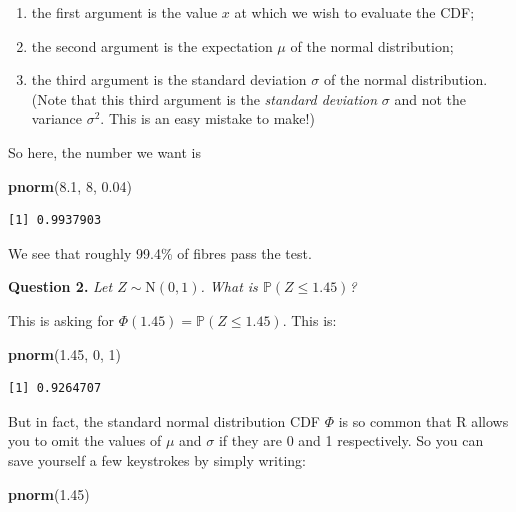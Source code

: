 \documentclass[
  a4paper,
]{book}
\newenvironment{Shaded}{\begin{snugshade}}{\end{snugshade}}
\newcommand{\DecValTok}[1]{\textcolor[rgb]{0.00,0.00,0.81}{#1}}
\newcommand{\FloatTok}[1]{\textcolor[rgb]{0.00,0.00,0.81}{#1}}
\newcommand{\FunctionTok}[1]{\textcolor[rgb]{0.13,0.29,0.53}{\textbf{#1}}}
\newcommand{\NormalTok}[1]{#1}
\providecommand{\tightlist}{%
  \setlength{\itemsep}{0pt}\setlength{\parskip}{0pt}}
\theoremstyle{definition}
\theoremstyle{definition}
\theoremstyle{definition}
\theoremstyle{definition}
\theoremstyle{remark}
\begin{document}
\begin{enumerate}
\def\labelenumi{\arabic{enumi}.}
\tightlist
\item
  the first argument is the value \(x\) at which we wish to evaluate the CDF;
\item
  the second argument is the expectation \(\mu\) of the normal distribution;
\item
  the third argument is the standard deviation \(\sigma\) of the normal distribution. (Note that this third argument is the \emph{standard deviation} \(\sigma\) and not the variance \(\sigma^2\). This is an easy mistake to make!)
\end{enumerate}

So here, the number we want is

\begin{Shaded}
\begin{Highlighting}[]
\FunctionTok{pnorm}\NormalTok{(}\FloatTok{8.1}\NormalTok{, }\DecValTok{8}\NormalTok{, }\FloatTok{0.04}\NormalTok{)}
\end{Highlighting}
\end{Shaded}

\begin{verbatim}
[1] 0.9937903
\end{verbatim}

We see that roughly 99.4\% of fibres pass the test.

\textbf{Question 2.} \emph{Let \(Z \sim \mathrm{N}(0,1)\). What is \(\mathbb P(Z \leq 1.45)\)?}

This is asking for \(\Phi(1.45) = \mathbb P(Z \leq 1.45)\). This is:

\begin{Shaded}
\begin{Highlighting}[]
\FunctionTok{pnorm}\NormalTok{(}\FloatTok{1.45}\NormalTok{, }\DecValTok{0}\NormalTok{, }\DecValTok{1}\NormalTok{)}
\end{Highlighting}
\end{Shaded}

\begin{verbatim}
[1] 0.9264707
\end{verbatim}

But in fact, the standard normal distribution CDF \(\Phi\) is so common that R allows you to omit the values of \(\mu\) and \(\sigma\) if they are 0 and 1 respectively. So you can save yourself a few keystrokes by simply writing:

\begin{Shaded}
\begin{Highlighting}[]
\FunctionTok{pnorm}\NormalTok{(}\FloatTok{1.45}\NormalTok{)}
\end{Highlighting}
\end{Shaded}
\end{document}
